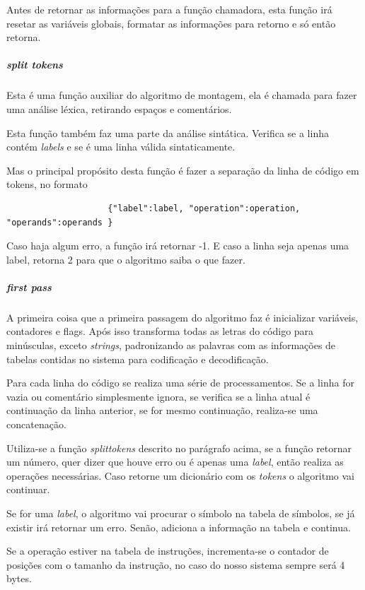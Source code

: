 				Antes de retornar as informações para a função chamadora, esta função irá resetar as variáveis globais, formatar as informações para retorno e só então retorna.

			\subparagraph{split tokens}
				Esta é uma função auxiliar do algoritmo de montagem, ela é chamada para fazer uma análise léxica, retirando espaços e comentários. 

				Esta função também faz uma parte da análise sintática. Verifica se a linha contém \textit{labels} e se é uma linha válida sintaticamente.

				Mas o principal propósito desta função é fazer a separação da linha de código em tokens, no formato

				\begin{verbatim}
					{"label":label, "operation":operation, "operands":operands }
				\end{verbatim}

				Caso haja algum erro, a função irá retornar -1. E caso a linha seja apenas uma label, retorna 2 para que o algoritmo saiba o que fazer.

			\subparagraph{first pass}						
				
				A primeira coisa que a primeira passagem do algoritmo faz é inicializar variáveis, contadores e flags. Após isso transforma todas as letras do código para minúsculas, exceto \textit{strings}, padronizando as palavras com as informações de tabelas contidas no sistema para codificação e decodificação.

				Para cada linha do código se realiza uma série de processamentos. Se a linha for vazia ou comentário simplesmente ignora, se verifica se a linha atual é continuação da linha anterior, se for mesmo continuação, realiza-se uma concatenação.

				Utiliza-se a função \textit{split\textunderscore tokens} descrito no parágrafo acima, se a função retornar um número, quer dizer que houve erro ou é apenas uma \textit{label}, então realiza as operações necessárias. Caso retorne um dicionário com os \textit{tokens} o algoritmo vai continuar.

				Se for uma \textit{label}, o algoritmo vai procurar o símbolo na tabela de símbolos, se já existir irá retornar um erro. Senão, adiciona a informação na tabela e continua.

				Se a operação estiver na tabela de instruções, incrementa-se o contador de posições com o tamanho da instrução, no caso do nosso sistema sempre será 4 bytes.

